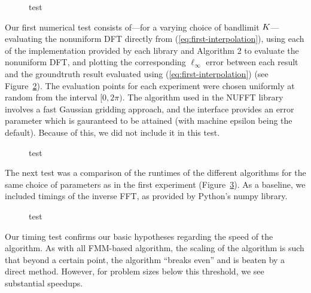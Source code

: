 \begin{figure}[h]
  \centering
  
  \caption{test}\label{fig:testfunc}
\end{figure}

Our first numerical test consists of---for a varying choice of
bandlimit $K$---evaluating the nonuniform DFT directly from
(\ref{eq:first-interpolation}), using each of the implementation
provided by each library and Algorithm 2 to evaluate the nonuniform
DFT, and plotting the corresponding $\ell_\infty$ error between each
result and the groundtruth result evaluated using
(\ref{eq:first-interpolation}) (see Figure~\ref{fig:linf-error}). The
evaluation points for each experiment were chosen uniformly at random
from the interval $[0, 2\pi)$. The algorithm used in the NUFFT library
involves a fast Gaussian gridding approach, and the interface provides
an error parameter which is gauranteed to be attained (with machine
epsilon being the default). Because of this, we did not include it in
this test.

\begin{figure}[h]
  \centering
  
  \caption{test}\label{fig:linf-error}
\end{figure}

The next test was a comparison of the runtimes of the different
algorithms for the same choice of parameters as in the first
experiment (Figure~\ref{fig:timings}). As a baseline, we included
timings of the inverse FFT, as provided by Python's numpy library.

\begin{figure}[h]
  \centering
  
  \caption{test}\label{fig:timings}
\end{figure}

Our timing test confirms our basic hypotheses regarding the speed of
the algorithm. As with all FMM-based algorithm, the scaling of the
algorithm is such that beyond a certain point, the algorithm ``breaks
even'' and is beaten by a direct method. However, for problem sizes
below this threshold, we see substantial speedups.

